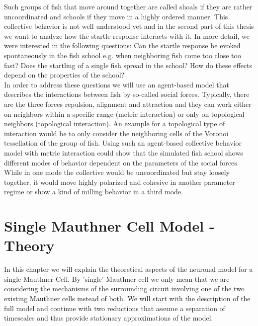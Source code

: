 \documentclass[a4paper,10pt,hidelinks]{scrreprt}
\begin{document}
	Such groups of fish that move around together are called shoals if they are rather 
	uncoordinated and schools if they move in a highly ordered manner.
	This collective behavior is not well understood yet and in the second part of this thesis we 
	want to analyze how the startle response interacts with it.
	In more detail, we were interested in the following questions:
	Can the startle response be evoked spontaneously in the fish school e.g. when neighboring fish 
	come too close too fast?
	Does the startling of a single fish spread in the school?
	How do these effects depend on the properties of the school?\\
	In order to address these questions we will use an agent-based model that describes the 
	interactions between fish by so-called social forces.
	Typically, there are the three forces repulsion, alignment and attraction and they can work 
	either on neighbors within a specific range (metric interaction) or only on topological 
	neighbors (topological interaction).
	An example for a topological type of interaction would be to only consider the neighboring 
	cells of the Voronoi tessellation of the group of fish.
	Using such an agent-based collective behavior model with metric interaction \cite{Couzin2002} 
	could show that the simulated fish school shows different modes of behavior dependent on the 
	parameters of the social forces.
	While in one mode the collective would be uncoordinated but stay loosely together, it would 
	move highly polarized and cohesive in another parameter regime or show a kind of milling 
	behavior in a third mode.
	\chapter{Single Mauthner Cell Model - Theory}
	In this chapter we will explain the theoretical aspects of the neuronal model for a single 
	Mauthner Cell.
	By 'single' Mauthner cell we only mean that we are considering the mechanisms of the 
	surrounding circuit involving one of the two existing Mauthner cells instead of both.
	We will start with the description of the full model and continue with two reductions that 
	assume a separation of timescales and thus provide stationary approximations of the model.
\end{document}
